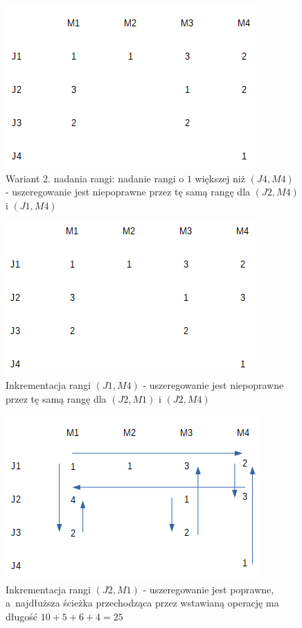 \documentclass[brudnopis]{xmgr}
\begin{document}
\begin{figure}[!tbh]
\centering
\includegraphics[width=.7\hsize]{fig/3_0.png}
\caption{Wariant 2. nadania rangi: nadanie rangi o $1$ większej niż $(J4, M4)$ - uszeregowanie jest niepoprawne przez tę samą rangę dla $(J2, M4)$ i $(J1, M4)$\label{diag:state3_0}}
\end{figure}\medskip

\begin{figure}[!tbh]
\centering
\includegraphics[width=.7\hsize]{fig/3_1.png}
\caption{Inkrementacja rangi $(J1, M4)$ - uszeregowanie jest niepoprawne przez tę samą rangę dla $(J2, M1)$ i $(J2, M4)$\label{diag:state3_1}}
\end{figure}\medskip

\begin{figure}[!tbh]
\centering
\includegraphics[width=.7\hsize]{fig/3.png}
\caption{Inkrementacja rangi $(J2, M1)$ - uszeregowanie jest poprawne, a~najdłuższa ścieżka przechodząca przez wstawianą operację ma długość $10 + 5 + 6 + 4 = 25$\label{diag:state3}}
\end{figure}\medskip
\end{document}
